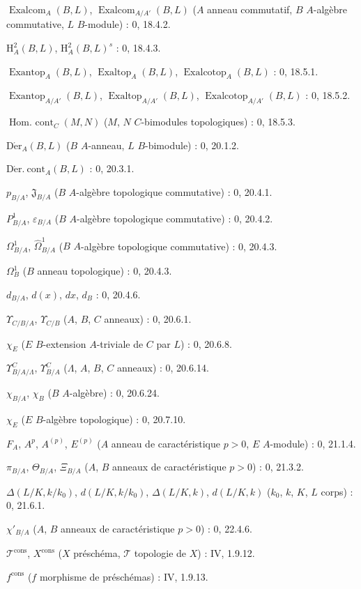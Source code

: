\documentclass[10pt,oneside]{book}
\newcommand{\oldpage}[2][]{%
  \setcounter{footnote}{0}%
  \marginpar{\scriptsize\textbf{#1}~|~#2}\ignorespaces}
\begin{document}
$\operatorname{Exalcom}_A(B,L)$, $\operatorname{Exalcom}_{A/A'}(B,L)$ ($A$ anneau commutatif, $B$ $A$-algèbre commutative, $L$ $B$-module) : 0, 18.4.2.\par
$\mathrm H_A^2(B,L)$, $\mathrm H_A^2(B,L)^s$ : 0, 18.4.3.\par
$\operatorname{Exantop}_A(B,L)$, $\operatorname{Exaltop}_A(B,L)$,
$\operatorname{Exalcotop}_A(B,L)$ : 0, 18.5.1.\par
$\operatorname{Exantop}_{A/A'}(B,L)$, $\operatorname{Exaltop}_{A/A'}(B,L)$,
$\operatorname{Exalcotop}_{A/A'}(B,L)$ : 0, 18.5.2.\par
$\operatorname{Hom.\ cont}_C(M,N)$ ($M$, $N$ $C$-bimodules topologiques) : 0, 18.5.3.\par
$\operatorname{D\acute{e}r}_A(B,L)$ ($B$ $A$-anneau, $L$ $B$-bimodule) : 0, 20.1.2.\par
$\operatorname{D\acute{e}r.\ cont}_A(B,L)$ : 0, 20.3.1.\par
$p_{B/A}$, $\mathfrak J_{B/A}$ ($B$ $A$-algèbre topologique commutative) : 0, 20.4.1.\par
$P^1_{B/A}$, $\varepsilon_{B/A}$ ($B$ $A$-algèbre topologique commutative) : 0, 20.4.2.\par
$\Omega^1_{B/A}$, $\widehat{\Omega}^1_{B/A}$ ($B$ $A$-algèbre topologique commutative) : 0, 20.4.3.\par
$\Omega^1_B$ ($B$ anneau topologique) : 0, 20.4.3.\par
$d_{B/A}$, $d(x)$, $dx$, $d_B$ : 0, 20.4.6.\par
$\Upsilon_{C/B/A}$, $\Upsilon_{C/B}$ ($A$, $B$, $C$ anneaux) : 0, 20.6.1.\par
$\chi_E$ ($E$ $B$-extension $A$-triviale de $C$ par $L$) : 0, 20.6.8.\par

\clearpage
\oldpage[IV-1]{253}
$\Upsilon^C_{B/A/\Lambda}$, $\Upsilon^C_{B/A}$ ($\Lambda$, $A$, $B$, $C$ anneaux) : 0, 20.6.14.\par
$\chi_{B/A}$, $\chi_B$ ($B$ $A$-algèbre) : 0, 20.6.24.\par
$\chi_E$ ($E$ $B$-algèbre topologique) : 0, 20.7.10.\par
$F_A$, $A^p$, $A^{(p)}$, $E^{(p)}$ ($A$ anneau de caractéristique $p>0$, $E$ $A$-module) : 0, 21.1.4.\par
$\pi_{B/A}$, $\Theta_{B/A}$, $\Xi_{B/A}$ ($A$, $B$ anneaux de caractéristique $p>0$) : 0, 21.3.2.\par
$\Delta(L/K,k/k_0)$, $d(L/K,k/k_0)$, $\Delta(L/K,k)$, $d(L/K,k)$ ($k_0$, $k$, $K$, $L$ corps) : 0, 21.6.1.\par
$\chi'_{B/A}$ ($A$, $B$ anneaux de caractéristique $p>0$) : 0, 22.4.6.\par
$\mathscr T^{\mathrm{cons}}$, $X^{\mathrm{cons}}$ ($X$ préschéma, $\mathscr T$ topologie de $X$) : IV, 1.9.12.\par
$f^{\mathrm{cons}}$ ($f$ morphisme de préschémas) : IV, 1.9.13.\par
\end{document}
